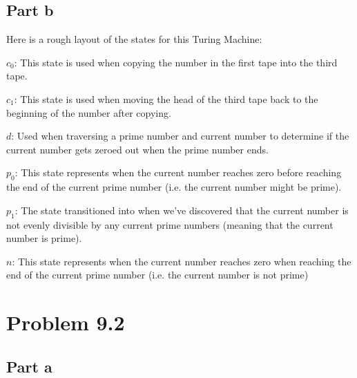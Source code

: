 \documentclass{article}%
\begin{document}
\subsection*{Part b}

Here is a rough layout of the states for this Turing Machine:
\begin{itemize}
    \begin{item}
        $c_0$: This state is used when copying the number in the first tape into the third tape.
    \end{item}

    \begin{item}
        $c_1$: This state is used when moving the head of the third tape back to the beginning of the number after copying.
    \end{item}

    \begin{item}
        $d$: Used when traversing a prime number and current number to determine if the current number gets zeroed out when the prime number ends.
    \end{item}

    \begin{item}
        $p_0$: This state represents when the current number reaches zero before reaching the end of the current prime number (i.e. the current number
        might be prime).
    \end{item}

    \begin{item}
        $p_1$: The state transitioned into when we've discovered that the current number is not evenly divisible by any current prime numbers (meaning that
        the current number is prime).
    \end{item}

    \begin{item}
        $n$: This state represents when the current number reaches zero when reaching the end of the current prime number (i.e. the current number is not
        prime)
    \end{item}
\end{itemize}

\section*{Problem 9.2}

\subsection*{Part a}
\end{document}
